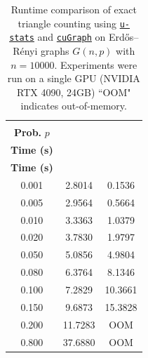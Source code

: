 \documentclass[12pt]{article}
\newcommand{\libref}[2]{\href{#2}{\texttt{#1}}}
\def\package{\libref{u-stats}{https://github.com/zrq1706/U-Statistics-Python}}
\theoremstyle{plain}
\theoremstyle{definition}
\def\package{\libref{u-stats}{https://github.com/zrq1706/U-Statistics-Python}}
\def\cugraph{\libref{cuGraph}{https://docs.rapids.ai/api/cugraph/stable/}}
\begin{document}
\begin{bibunit}[agsm]
\begin{table}[htbp]
\centering
\caption{Runtime comparison of exact triangle counting  using \package{} and \cugraph{} on Erd\H{o}s--R\'enyi graphs $G(n, p)$ with $n = 10000$. Experiments were run on a single GPU (NVIDIA RTX 4090, 24GB) ``OOM" indicates out-of-memory.}
\label{tab:triangle_counting_gpu}
\begin{tabular}{ccc}
\toprule
\makecell{\textbf{Edge} \\ \textbf{Prob.} $p$} & 
\makecell{\textbf{\package{}} \\ \textbf{Time (s)}} & 
\makecell{\textbf{\cugraph{}} \\ \textbf{Time (s)}} \\
\midrule
0.001 & 2.8014 & 0.1536 \\
0.005 & 2.9564 & 0.5664 \\
0.010 & 3.3363 & 1.0379 \\
0.020 & 3.7830 & 1.9797 \\
0.050 & 5.0856 & 4.9804 \\
0.080 & 6.3764 & 8.1346 \\
0.100 & 7.2829 & 10.3661 \\
0.150 & 9.6873 & 15.3828 \\
0.200 & 11.7283 & OOM \\
0.800 & 37.6880 & OOM \\
\bottomrule
\end{tabular}
\end{table}


\end{bibunit}
\end{document}
